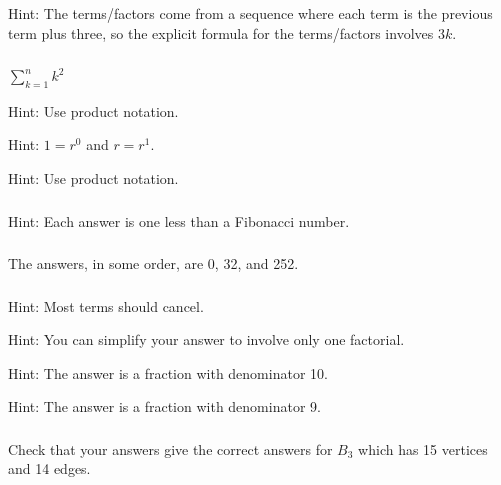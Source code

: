 \subsubsection*{ \answers}
Hint: The terms/factors come from a sequence where each term is the previous term plus three, so the explicit formula for the terms/factors involves $3k$.

\subsubsection*{ \answers}
\begin{apart}
    \item $\displaystyle \sum_{k=1}^nk^2$
    \item Hint: Use product notation.
    \item Hint: $1 = r^0$ and $r = r^1$.
    \item Hint: Use product notation.
\end{apart}

\subsubsection*{ \answers}
Hint: Each answer is one less than a Fibonacci number.

\subsubsection*{ \answers}
The answers, in some order, are 0, 32, and 252.

\subsubsection*{ \answers}
Hint: Most terms should cancel.  
\begin{apart}
    \item Hint: You can simplify your answer to involve only one factorial.
    \item Hint: The answer is a fraction with denominator 10.
    \item Hint: The answer is a fraction with denominator 9.
\end{apart}

\subsubsection*{ \answers}
Check that your answers give the correct answers for $B_3$ which has 15 vertices and 14 edges.







